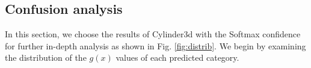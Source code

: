 \documentclass[journal]{IEEEtran}
\begin{document}
%
%
%
%	
%	


\subsection{Confusion analysis}

In this section, we choose the results of Cylinder3d with the Softmax confidence for further in-depth analysis as shown in Fig. \ref{fig:distrib}. 
We begin by examining the distribution of the $g(x)$ values of each predicted category.
\end{document}
